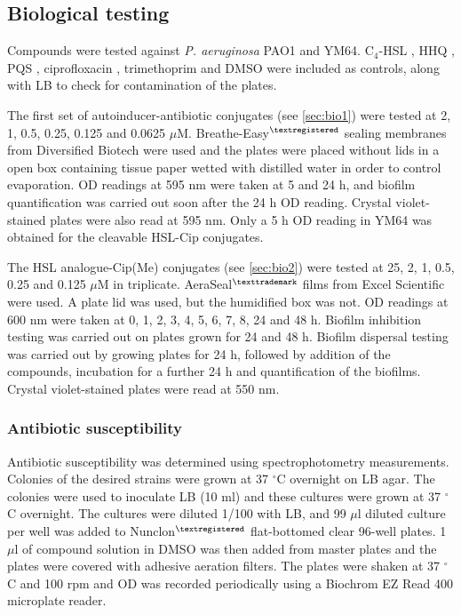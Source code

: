 \subsection{Biological testing\label{sec:exp_bio}}

Compounds were tested against \textit{P. aeruginosa} PAO1\cite{Stover2000} and YM64\cite{Morita2001}.
C$_4$-HSL , HHQ , PQS , ciprofloxacin , trimethoprim  and DMSO were included as controls, along with LB to check for contamination of the plates.

The first set of autoinducer-antibiotic conjugates (see \ref{sec:bio1}) were tested at 2, 1, 0.5, 0.25, 0.125 and 0.0625 $\mu$M. 
Breathe-Easy$^{\tiny{\textregistered}}$ sealing membranes from Diversified Biotech were used and the plates were placed without lids in a open box containing tissue paper wetted with distilled water in order to control evaporation. 
OD readings at 595 nm were taken at 5 and 24 h, and biofilm quantification was carried out soon after the 24 h OD reading. Crystal violet-stained plates were also read at 595 nm.
Only a 5 h OD reading in YM64 was obtained for the cleavable HSL-Cip conjugates.

The HSL analogue-Cip(Me) conjugates (see \ref{sec:bio2}) were tested at 25, 2, 1, 0.5, 0.25 and 0.125 $\mu$M in triplicate.
AeraSeal$^{\tiny{\texttrademark}}$ films from Excel Scientific were used. A plate lid was used, but the humidified box was not.
OD readings at 600 nm were taken at 0, 1, 2, 3, 4, 5, 6, 7, 8, 24 and 48 h. 
Biofilm inhibition testing was carried out on plates grown for 24 and 48 h. Biofilm dispersal testing was carried out by growing plates for 24 h, followed by addition of the compounds, incubation for a further 24 h and quantification of the biofilms. Crystal violet-stained plates were read at 550 nm.

\subsubsection{Antibiotic susceptibility\label{sec:ABsus}}

Antibiotic susceptibility was determined using spectrophotometry measurements.
Colonies of the desired strains were grown at 37 $^{\circ}$C overnight on LB agar.
The colonies were used to inoculate LB (10 ml) and these cultures were grown at 37 $^{\circ}$C overnight. 
The cultures were diluted 1/100 with LB, and 99 $\mu$l diluted culture per well was added to Nunclon$^{\tiny{\textregistered}}$ flat-bottomed clear 96-well plates. 1 $\mu$l of compound solution in DMSO was then added from master plates and the plates were covered with adhesive aeration filters. 
The plates were shaken at 37 $^{\circ}$C and 100 rpm and OD was recorded periodically using a Biochrom EZ Read 400 microplate reader.

